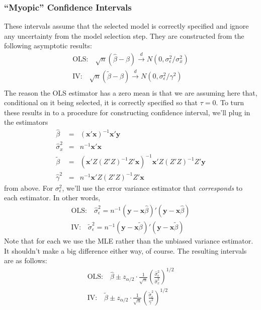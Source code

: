\documentclass[12pt]{article}
\theoremstyle{definition}
\begin{document}
\subsubsection{``Myopic'' Confidence Intervals}
These intervals assume that the selected model is correctly specified and ignore any uncertainty from the model selection step. They are constructed from the following asymptotic results:
  \begin{eqnarray*}
    \mbox{OLS:} \quad \sqrt{n}(\widehat{\beta} - \beta) \overset{d}{\rightarrow} N(0, \sigma_\epsilon^2/\sigma_x^2)\\
    \mbox{IV:} \quad \sqrt{n}(\widetilde{\beta} - \beta) \overset{d}{\rightarrow} N(0, \sigma_\epsilon^2/\gamma^2)\\
  \end{eqnarray*}
The reason the OLS estimator has a zero mean is that we are assuming here that, conditional on it being selected, it is correctly specified so that $\tau = 0$. To turn these results in to a procedure for constructing confidence interval, we'll plug in the estimators
 \begin{eqnarray*}
    \widehat{\beta} &=& (\mathbf{x}'\mathbf{x})^{-1}\mathbf{x}'\mathbf{y}\\
    \widehat{\sigma}_x^2 &=& n^{-1}\mathbf{x}'\mathbf{x} \\
    \widetilde{\beta} &=& (\mathbf{x}'Z(Z'Z)^{-1} Z'\mathbf{x})^{-1}\mathbf{x}'Z (Z'Z)^{-1} Z'\mathbf{y}\\
    \widehat{\gamma}^2 &=& n^{-1} \mathbf{x}'Z(Z'Z)^{-1}Z'\mathbf{x}
  \end{eqnarray*}
from above. For $\sigma_\epsilon^2$, we'll use the error variance estimator that \emph{corresponds} to each estimator. In other words, 
  \begin{eqnarray*}
    \mbox{OLS:} \quad \widehat{\sigma}_\epsilon^2 = n^{-1} \left(\mathbf{y} - \mathbf{x}\widehat{\beta}\right)'\left(\mathbf{y} - \mathbf{x}\widehat{\beta}\right)\\
    \mbox{IV:} \quad \widetilde{\sigma}_\epsilon^2 = n^{-1} \left(\mathbf{y} - \mathbf{x}\widetilde{\beta}\right)'\left(\mathbf{y} - \mathbf{x}\widetilde{\beta}\right)
  \end{eqnarray*}
Note that for each we use the MLE rather than the unbiased variance estimator. It shouldn't make a big difference either way, of course. The resulting intervals are as follows:
  \begin{eqnarray*}
    \mbox{OLS:} \quad \widehat{\beta} \pm z_{\alpha/2} \cdot \frac{1}{\sqrt{n}} \left(\frac{\widehat{\sigma}_\epsilon^2}{\widehat{\sigma}_x^2} \right)^{1/2}\\
    \mbox{IV:} \quad \widetilde{\beta} \pm z_{\alpha/2} \cdot \frac{1}{\sqrt{n}} \left(\frac{\widetilde{\sigma}_\epsilon^2}{\widehat{\gamma}^2} \right)^{1/2}
  \end{eqnarray*}
\end{document}

